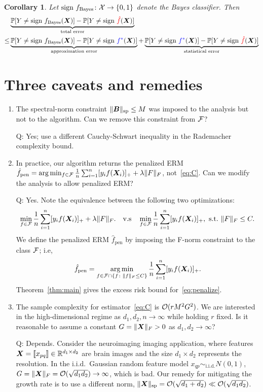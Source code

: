 \documentclass[11pt]{article}
\theoremstyle{plain}
\newtheorem{cor}{Corollary}
\theoremstyle{definition}
\newcommand*{\KeepStyleUnderBrace}[1]{%
  \mathop{%
    \mathchoice
    {\underbrace{\displaystyle#1}}%
    {\underbrace{\textstyle#1}}%
    {\underbrace{\scriptstyle#1}}%
    {\underbrace{\scriptscriptstyle#1}}%
  }\limits
}
\begin{document}
\begin{cor} Let $\text{sign }f_{\text{Bayes}}\colon \mathcal{X} \to \{0,1\}$ denote the Bayes classifier. Then
\begin{align}
&\KeepStyleUnderBrace{\mathbb{P}[Y\neq \text{sign }f_{\text{Bayes}}(\mX)] - \mathbb{P}[Y\neq \text{sign }{\color{red} \hat f}(\mX)]}_{\text{total error}}  \\
\leq &\KeepStyleUnderBrace{\mathbb{P}[Y\neq \text{sign }f_{\text{Bayes}}(\mX)]  - \mathbb{P}[Y\neq \text{sign }{\color{blue}f^*}(\mX)]}_{\text{approximation error}} +\KeepStyleUnderBrace{\mathbb{P}[Y\neq \text{sign }{\color{blue}f^*}(\mX)] -\mathbb{P}[Y\neq \text{sign }{\color{red} \hat f}(\mX)]}_{\text{statistical error}}
\end{align}
\end{cor}
\section{Three caveats and remedies}
\begin{enumerate}
\item The spectral-norm constraint $\lVert\bm B\rVert_\text{sp}\leq M$ was imposed to the analysis but not to the algorithm. Can we remove this constraint from $\mathcal{F}$?  

Q: Yes; use a different Cauchy-Schwart inequality in the Rademacher complexity bound. 

\item In practice, our algorithm returns the penalized ERM $\hat f_\text{pen} =\arg\min_{f\in \mathcal{F}}{1\over n}\sum_{i=1}^n [y_if(\bm X_i)]_{+}+\lambda\lVert F\rVert_F$, not~\eqref{eq:C}. Can we modify the analysis to allow penalized ERM? 

Q: Yes. Note the equivalence between the following two optimizations:
\[
\min_{f\in \mathcal{F}}{1\over n}\sum_{i=1}^n [y_if(\bm X_i)]_{+}+\lambda\lVert F\rVert_F. \quad \text{v.s}\quad \min_{f\in \mathcal{F}}{1\over n}\sum_{i=1}^n [y_if(\bm X_i)]_{+},  \ \text{s.t.}\ \lVert F\rVert_F\leq C.
\]
We define the penalized ERM $\hat f_{\text{pen}}$ by imposing the F-norm constraint to the class $\mathcal{F}$; i.e,
\begin{equation}\label{eq:penalize}
\hat f_\text{pen} =\operatorname*{arg\,min}_{f\in \mathcal{F} \cap \{f\colon \lVert f\rVert_F\leq C\}}{1\over n}\sum_{i=1}^n [y_if(\bm X_i)]_{+}.
\end{equation}
Theorem~\ref{thm:main} gives the excess risk bound for~\eqref{eq:penalize}.
\item The sample complexity for estimator~\eqref{eq:C} is $\mathcal{O}(rM^2G^2)$. We are interested in the high-dimensional regime as $d_1, d_2, n\to \infty$ while holding $r$ fixed. Is it reasonable to assume a constant $G=\lVert\bm X\rVert_F>0$ as $d_1, d_2\to \infty$? 

Q: Depends. Consider the neuroimaging imaging application, where features $\bm X=\llbracket x_{pq} \rrbracket\in\mathbb{R}^{d_1\times d_2}$ are brain images and the size $d_1\times d_2$ represents the resolution. In the i.i.d.\ Gaussian random feature model $x_{qp}\sim_{\text{i.i.d.}} N(0,1)$, $G=\lVert\bm X\rVert_F=\mathcal{O}(\sqrt{d_1d_2}) \to \infty$, which is bad. Our remedy for mitigating the growth rate is to use a different norm, $\lVert\bm X\rVert_\text{sp}=\mathcal{O}(\sqrt{d_1+d_2}) \ll \mathcal{O}(\sqrt{d_1d_2})$. 
\end{enumerate}
\end{document}
